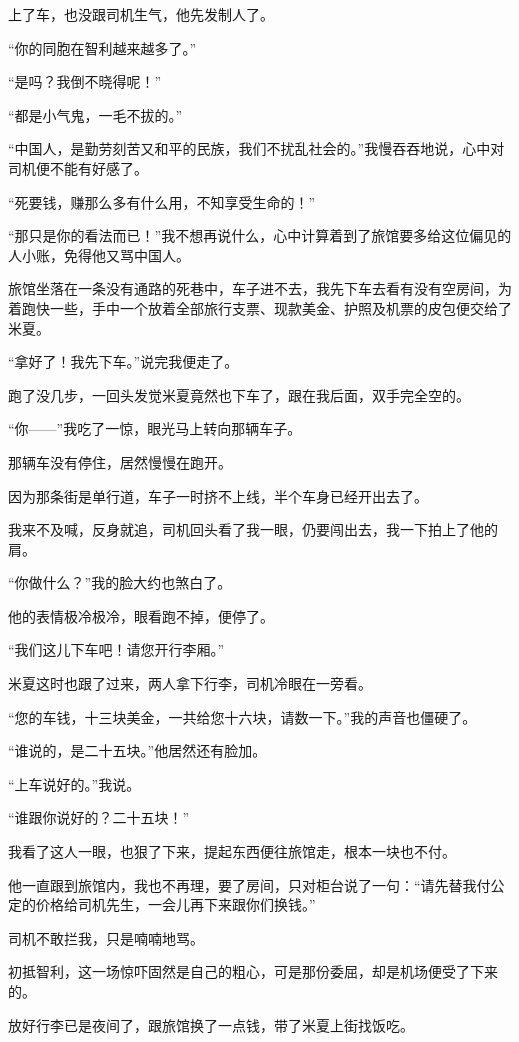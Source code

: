 \par 上了车，也没跟司机生气，他先发制人了。
\par “你的同胞在智利越来越多了。”
\par “是吗？我倒不晓得呢！”
\par “都是小气鬼，一毛不拔的。”
\par “中国人，是勤劳刻苦又和平的民族，我们不扰乱社会的。”我慢吞吞地说，心中对司机便不能有好感了。
\par “死要钱，赚那么多有什么用，不知享受生命的！”
\par “那只是你的看法而已！”我不想再说什么，心中计算着到了旅馆要多给这位偏见的人小账，免得他又骂中国人。
\par 旅馆坐落在一条没有通路的死巷中，车子进不去，我先下车去看有没有空房间，为着跑快一些，手中一个放着全部旅行支票、现款美金、护照及机票的皮包便交给了米夏。
\par “拿好了！我先下车。”说完我便走了。
\par 跑了没几步，一回头发觉米夏竟然也下车了，跟在我后面，双手完全空的。
\par “你——”我吃了一惊，眼光马上转向那辆车子。
\par 那辆车没有停住，居然慢慢在跑开。
\par 因为那条街是单行道，车子一时挤不上线，半个车身已经开出去了。
\par 我来不及喊，反身就追，司机回头看了我一眼，仍要闯出去，我一下拍上了他的肩。
\par “你做什么？”我的脸大约也煞白了。
\par 他的表情极冷极冷，眼看跑不掉，便停了。
\par “我们这儿下车吧！请您开行李厢。”
\par 米夏这时也跟了过来，两人拿下行李，司机冷眼在一旁看。
\par “您的车钱，十三块美金，一共给您十六块，请数一下。”我的声音也僵硬了。
\par “谁说的，是二十五块。”他居然还有脸加。
\par “上车说好的。”我说。
\par “谁跟你说好的？二十五块！”
\par 我看了这人一眼，也狠了下来，提起东西便往旅馆走，根本一块也不付。
\par 他一直跟到旅馆内，我也不再理，要了房间，只对柜台说了一句：“请先替我付公定的价格给司机先生，一会儿再下来跟你们换钱。”
\par 司机不敢拦我，只是喃喃地骂。
\par 初抵智利，这一场惊吓固然是自己的粗心，可是那份委屈，却是机场便受了下来的。
\par 放好行李已是夜间了，跟旅馆换了一点钱，带了米夏上街找饭吃。
